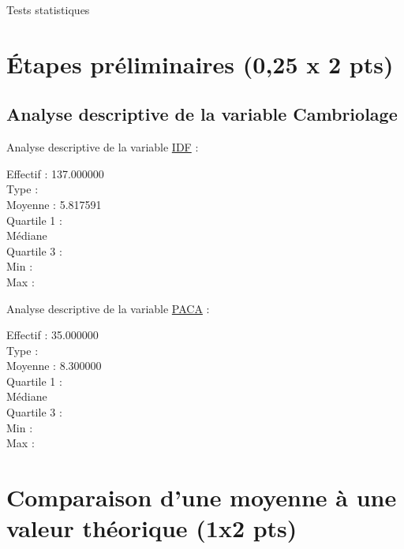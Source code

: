 \documentclass{article}
\begin{document}
\begin{center}
    {\Huge Tests statistiques}
\end{center}


\section{Étapes préliminaires (0,25 x 2 pts)}
\subsection{Analyse descriptive de la variable Cambriolage}
Analyse descriptive de la variable \underline{IDF} :
\begin{description}
    \item[Effectif : 137.000000]
    \item[Type :] 
    \item[Moyenne : 5.817591] 
    \item[Quartile 1 :] 
    \item[Médiane] 
    \item[Quartile 3 :] 
    \item[Min :] 
    \item[Max :] 
\end{description}

Analyse descriptive de la variable \underline{PACA} :
\begin{description}
	\item[Effectif : 35.000000]
	\item[Type :] 
	\item[Moyenne : 8.300000] 
	\item[Quartile 1 :] 
	\item[Médiane] 
	\item[Quartile 3 :] 
	\item[Min :] 
	\item[Max :] 
\end{description}

\section{Comparaison d'une moyenne à une valeur théorique (1x2 pts)}
\end{document}
